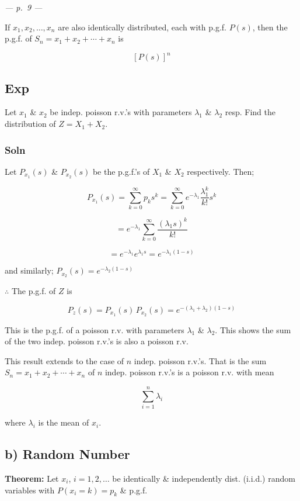 \documentclass[
]{article}
\begin{document}
\emph{--- p.~9 ---}

If \(x_1, x_2, \ldots, x_n\) are also identically distributed, each with
p.g.f. \(P(s)\), then the p.g.f. of \(S_n = x_1 + x_2 + \cdots + x_n\)
is

\[\left[P(s)\right]^n\]

\subsection{Exp}\label{exp-5}

Let \(x_1\) \& \(x_2\) be indep. poisson r.v.'s with parameters
\(\lambda_1\) \& \(\lambda_2\) resp. Find the distribution of
\(Z = X_1 + X_2\).

\subsubsection{Soln}\label{soln-2}

Let \(P_{x_1}(s)\) \& \(P_{x_2}(s)\) be the p.g.f.'s of \(X_1\) \&
\(X_2\) respectively. Then;

\[P_{x_1}(s) = \sum_{k=0}^{\infty} p_k s^k = \sum_{k=0}^{\infty} e^{-\lambda_1} \frac{\lambda_1^k}{k!} s^k\]

\[= e^{-\lambda_1} \sum_{k=0}^{\infty} \frac{(\lambda_1 s)^k}{k!}\]

\[= e^{-\lambda_1} e^{\lambda_1 s} = e^{-\lambda_1 (1-s)}\]

and similarly; \(P_{x_2}(s) = e^{-\lambda_2 (1-s)}\)

\(\therefore\) The p.g.f. of \(Z\) is

\[P_z(s) = P_{x_1}(s)\, P_{x_2}(s) = e^{-(\lambda_1 + \lambda_2)(1-s)}\]

This is the p.g.f. of a poisson r.v. with parameters \(\lambda_1\) \&
\(\lambda_2\). This shows the sum of the two indep. poisson r.v.'s is
also a poisson r.v.

This result extends to the case of \(n\) indep. poisson r.v.'s. That is
the sum \(S_n = x_1 + x_2 + \cdots + x_n\) of \(n\) indep. poisson
r.v.'s is a poisson r.v. with mean

\[\sum_{i=1}^{n} \lambda_i\]

where \(\lambda_i\) is the mean of \(x_i\).

\subsection{b) Random Number}\label{b-random-number}

\textbf{Theorem:} Let \(x_i\), \(i = 1, 2, \ldots\) be identically \&
independently dist. (i.i.d.) random variables with \(P(x_i = k) = p_k\)
\& p.g.f.
\end{document}
